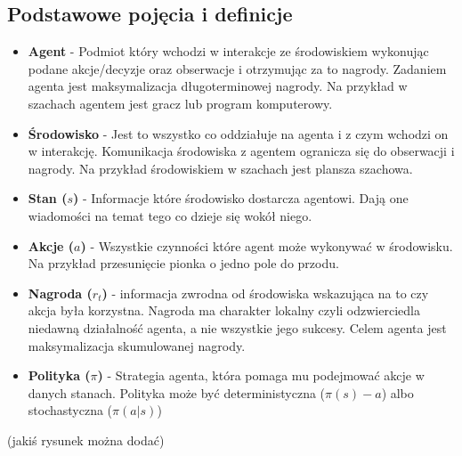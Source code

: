 \documentclass[a4paper, 10pt]{article}
\begin{document}
    \subsection{Podstawowe pojęcia i definicje}
    \begin{itemize}
        \item \textbf{Agent} - Podmiot który wchodzi w interakcje ze środowiskiem wykonując podane akcje/decyzje oraz obserwacje i otrzymując za to nagrody.
        Zadaniem agenta jest maksymalizacja długoterminowej nagrody. Na przykład w szachach agentem jest gracz lub program komputerowy.
        \item \textbf{Środowisko} - Jest to wszystko co oddziałuje na agenta i z czym wchodzi on w interakcję. Komunikacja środowiska
        z agentem ogranicza się do obserwacji i nagrody. Na przykład środowiskiem w szachach jest plansza szachowa.
        \item \textbf{Stan (\( s \))} - Informacje które środowisko dostarcza agentowi. Dają one wiadomości na temat tego co dzieje się wokół niego.
        \item \textbf{Akcje (\( a \))} - Wszystkie czynności które agent może wykonywać w środowisku. Na przykład przesunięcie
        pionka o jedno pole do przodu.
        \item \textbf{Nagroda (\( r_t \))} - informacja zwrodna od środowiska wskazująca na to czy akcja była korzystna.
        Nagroda ma charakter lokalny czyli odzwierciedla niedawną działalność agenta, a nie wszystkie jego sukcesy. Celem agenta jest maksymalizacja
        skumulowanej nagrody.
        \item \textbf{Polityka (\( \pi \))} - Strategia agenta, która pomaga mu podejmować akcje w danych stanach. Polityka może być deterministyczna
        (\( \pi(s) - a \)) albo stochastyczna (\( \pi(a|s) \))
    \end{itemize}
    (jakiś rysunek można dodać)
\end{document}
